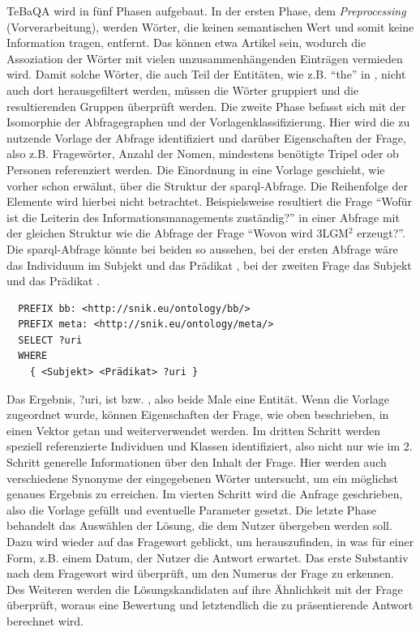 TeBaQA wird in fünf Phasen aufgebaut.
In der ersten Phase, dem \emph{Preprocessing} (Vorverarbeitung), werden Wörter, die keinen semantischen Wert und somit keine Information tragen, entfernt.
Das können etwa Artikel sein, wodurch die Assoziation der Wörter mit vielen unzusammenhängenden Einträgen vermieden wird.
Damit solche Wörter, die auch Teil der Entitäten, wie z.B. \enquote{the} in ,
nicht auch dort herausgefiltert werden, müssen die Wörter gruppiert und die resultierenden Gruppen überprüft werden.
Die zweite Phase befasst sich mit der Isomorphie der Abfragegraphen und der Vorlagenklassifizierung.
Hier wird die zu nutzende Vorlage der Abfrage identifiziert und darüber Eigenschaften der Frage, also z.B. Fragewörter,
Anzahl der Nomen, mindestens benötigte Tripel oder ob Personen referenziert werden.
Die Einordnung in eine Vorlage geschieht, wie vorher schon erwähnt, über die Struktur der \ac{sparql}-Abfrage.
Die Reihenfolge der Elemente wird hierbei nicht betrachtet.
Beispielsweise resultiert die Frage \enquote{Wofür ist die Leiterin des Informationsmanagements zuständig?}
in einer Abfrage mit der gleichen Struktur wie die Abfrage der Frage \enquote{Wovon wird 3LGM$^2$ erzeugt?}.
Die \ac{sparql}-Abfrage könnte bei beiden so aussehen, bei der ersten Abfrage wäre das Individuum im Subjekt  und das Prädikat ,
bei der zweiten Frage das Subjekt  und das Prädikat .
\begin{lstlisting}
  PREFIX bb: <http://snik.eu/ontology/bb/>
  PREFIX meta: <http://snik.eu/ontology/meta/>
  SELECT ?uri
  WHERE
    { <Subjekt> <Prädikat> ?uri }
\end{lstlisting}
Das Ergebnis, ?uri, ist  bzw. , also beide Male eine Entität.
Wenn die Vorlage zugeordnet wurde, können Eigenschaften der Frage, wie oben beschrieben, in einen Vektor getan und weiterverwendet werden.
Im dritten Schritt werden speziell referenzierte Individuen und Klassen identifiziert, also nicht nur wie im 2. Schritt generelle Informationen über den Inhalt der Frage.
Hier werden auch verschiedene Synonyme der eingegebenen Wörter untersucht, um ein möglichst genaues Ergebnis zu erreichen.
Im vierten Schritt wird die Anfrage geschrieben, also die Vorlage gefüllt und eventuelle Parameter gesetzt.
Die letzte Phase behandelt das Auswählen der Lösung, die dem Nutzer übergeben werden soll.
Dazu wird wieder auf das Fragewort geblickt, um herauszufinden, in was für einer Form, z.B. einem Datum, der Nutzer die Antwort erwartet.
Das erste Substantiv nach dem Fragewort wird überprüft, um den Numerus der Frage zu erkennen.
Des Weiteren werden die Lösungskandidaten auf ihre Ähnlichkeit mit der Frage überprüft, woraus eine Bewertung und letztendlich die zu präsentierende Antwort berechnet wird.

